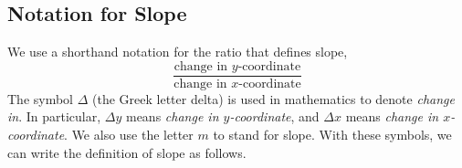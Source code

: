 \documentclass[10pt,]{book}
\theoremstyle{plain}
\theoremstyle{definition}
\theoremstyle{definition}
\numberwithin{equation}{section}
\begin{document}
\subsection[Notation for Slope]{Notation for Slope}\label{subsection-20}

    We use a shorthand notation for the ratio that defines slope,
    \begin{equation*}\frac{\text{change in }y\text{-coordinate}}{\text{change in }x\text{-coordinate}}\end{equation*} 
    The symbol \(\Delta\) (the Greek letter delta) is used in mathematics to denote \emph{change in}. In particular, \(\Delta y\) means \emph{change in \(y\)-coordinate}, and \(\Delta x\) means \emph{change in \(x\)-coordinate}. We also use the letter \(m\) to stand for slope. With these symbols, we can write the definition of slope as follows.
%
\typeout{************************************************}
\typeout{************************************************}
\end{document}
